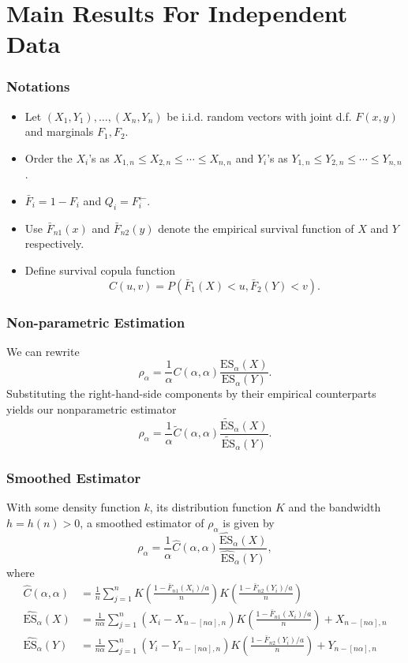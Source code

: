 \documentclass{beamer}
\newcommand{\suit}[1]{\left(#1\right)}
\begin{document}
\section{Main Results For Independent Data}

\begin{frame}
    \frametitle{Notations}
\begin{itemize}
    \item Let $(X_1,Y_1), \dots, (X_n,Y_n)$ be i.i.d. random vectors with joint d.f. $F(x,y)$ and marginals $F_1,F_2$. 
    \item Order the $X_i$'s as $X_{1,n}\le X_{2,n}\le \cdots\le X_{n,n}$ and $Y_i$'s as $Y_{1,n}\le Y_{2,n}\le \cdots\le Y_{n,n}$.
    \item $\bar{F}_i=1-F_i$ and $Q_i=F_i^{\leftarrow}$.
    \item Use $\bar{F}_{n1}(x)$ and $\bar{F}_{n2}(y)$ denote the empirical survival function of $X$ and $Y$ respectively.
    \item Define survival copula function
        $$
            C(u,v)=P\suit{\bar{F}_1(X)<u, \bar{F}_2(Y)<v}.
        $$
\end{itemize}
\end{frame}


\begin{frame}
    \frametitle{Non-parametric Estimation}
We can rewrite 
$$
\rho_{\alpha}=\frac{1}{\alpha}C(\alpha,\alpha)\frac{\text{ES}_{\alpha}(X)}{\text{ES}_{\alpha}(Y)}.
$$
Substituting the right-hand-side components by their empirical
counterparts yields our nonparametric estimator
$$
\rho_{\alpha}=\frac{1}{\alpha}\widetilde{C}(\alpha,\alpha)\frac{\widetilde{\text{ES}}_{\alpha}(X)}{\widetilde{\text{ES}}_{\alpha}(Y)}.
$$

\end{frame}

\begin{frame}
    \frametitle{Smoothed Estimator}
  With some density function $k$, its distribution function $K$ and the bandwidth $h=h(n)>0$, a smoothed estimator of $\rho_{\alpha}$ is given by
    $$
    \rho_{\alpha}=\frac{1}{\alpha}\widehat{C}(\alpha,\alpha)\frac{\widehat{\text{ES}}_{\alpha}(X)}{\widehat{\text{ES}}_{\alpha}(Y)},
    $$
    where
    $$
        \begin{aligned}
        \widehat{C}(\alpha,\alpha)&= \frac{1}{n}\sum_{j=1}^n K\suit{\frac{1-\bar{F}_{n1}(X_i)/a}{n}}K\suit{\frac{1-\bar{F}_{n2}(Y_i)/a}{n}}\\
        \widehat{\text{ES}}_{\alpha}(X)&= \frac{1}{n\alpha}\sum_{j=1}^n (X_i-X_{n-[n\alpha],n})K\suit{\frac{1-\bar{F}_{n1}(X_i)/a}{n}}+X_{n-[n\alpha],n} \\
        \widehat{\text{ES}}_{\alpha}(Y)&= \frac{1}{n\alpha}\sum_{j=1}^n (Y_i-Y_{n-[n\alpha],n})K\suit{\frac{1-\bar{F}_{n2}(Y_i)/a}{n}}+Y_{n-[n\alpha],n} \\
        \end{aligned}
    $$
\end{frame}
\end{document}

